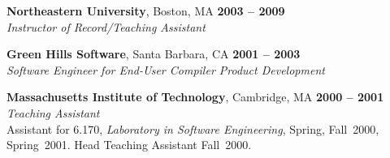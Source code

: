 \documentclass[margin,line,draft]{res}
\def\noneed#1{}
\def\coursetitle#1{\textsl{#1}}
\def\coursenum#1{#1}
\def\course#1#2{\coursenum{#1} \coursetitle{#2}}
\begin{document}
\begin{resume}
\newpage

    \textbf{Northeastern University}, Boston, MA \hfill \textbf{2003 -- 2009}\\\vspace{1mm}%
    \textsl{Instructor of Record/Teaching Assistant}

    \textbf{Green Hills Software}, Santa Barbara, CA \hfill \textbf{2001 -- 2003}\\\vspace{1mm}%
    \textsl{Software Engineer for End-User Compiler Product Development}
% 
% 
% 

\noneed{
    \textbf{ESP High School Studies Program}, Cambridge, MA \vspace{2mm}\\\vspace{1mm}%
    \textsl{Instructor} \hfill \textbf{2001 -- 2001}\\
    Volunteer Instructor M-20A: \coursetitle{Square Peg Solutions}
    \noneed{Problem Solving via Decomposition, Visualization, and Abstraction}
}

    \textbf{Massachusetts Institute of Technology}, Cambridge, MA \hfill \textbf{2000 -- 2001} \\\vspace{1mm}%
    \textsl{Teaching Assistant} \\
    Assistant for 6.170, \coursetitle{Laboratory in Software Engineering},
    Spring, Fall~2000, Spring~2001. {Head Teaching Assistant Fall~2000.}


\end{resume}
\end{document}
